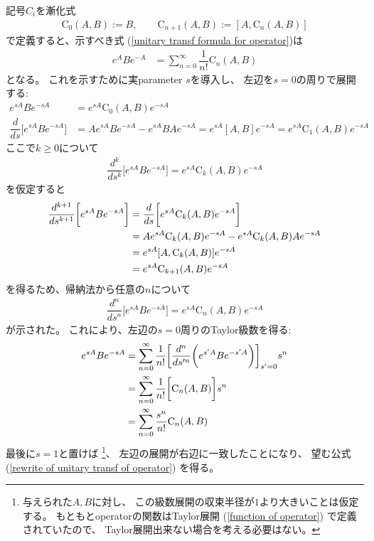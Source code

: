 記号$C_i$を漸化式
\begin{align}
    \mathrm{C}_0(A,B)
    :=
    B
,\qquad
    \mathrm{C}_{n+1}(A,B)
    :=
    [A,\mathrm{C}_{n}(A,B)]
\end{align}
で定義すると、示すべき式
(\ref{unitary transf formula for operator})は
\begin{align}
    e^{A} B e^{-A}
    &=
    \sum_{n=0}^\infty
    \dfrac{1}{n!}
    \mathrm{C}_{n}(A,B)
\label{rewrite of unitary transf of operator}
\end{align}
となる。
これを示すために実parameter $s$を導入し、
左辺を$s=0$の周りで展開する:
\begin{subequations}
\begin{align}
    e^{sA} B e^{-sA}
    &=
    e^{sA} \mathrm{C}_{0}(A,B)e^{-sA}
\\
    \dfrac{d}{ds}\bigg[
        e^{sA} B e^{-sA}
    \bigg]
    &=
    Ae^{sA} B e^{-sA}
    -
    e^{sA} B A e^{-sA}
    =
    e^{sA} [A,B]e^{-sA}
    =
    e^{sA} \mathrm{C}_{1}(A,B) e^{-sA}
\end{align}
\end{subequations}
ここで$k \ge 0$について
\begin{align}
    \dfrac{d^k}{ds^k}\bigg[
        e^{sA} B e^{-sA}
    \bigg]
    =
    e^{sA} \mathrm{C}_{k}(A,B) e^{-sA}
\end{align}
を仮定すると
\begin{align}
    \dfrac{d^{k+1}}{ds^{k+1}}
    \bigg[
        e^{sA} B e^{-sA}
    \bigg]
&=
    \dfrac{d}{ds}\bigg[
        e^{sA} \mathrm{C}_{k}(A,B) e^{-sA}
    \bigg]
\notag\\&=
    A e^{sA} \mathrm{C}_{k}(A,B) e^{-sA}
    -
    e^{sA} \mathrm{C}_{k}(A,B) Ae^{-sA}
\notag\\&=
    e^{sA} [A,\mathrm{C}_{k}(A,B)] e^{-sA}
\notag\\&=
    e^{sA}  \mathrm{C}_{k+1}(A,B) e^{-sA}
\end{align}
を得るため、帰納法から任意の$n$について
\begin{align}
    \dfrac{d^n}{ds^n}\bigg[
        e^{sA} B e^{-sA}
    \bigg]
    =
    e^{sA} \mathrm{C}_{n}(A,B) e^{-sA}
\end{align}
が示された。
これにより、左辺の$s=0$周りのTaylor級数を得る:
\begin{align}
    e^{sA} B e^{-sA}
&=
    \sum_{n=0}^\infty
        \dfrac{1}{n!}
    \bigg[
        \dfrac{d^n}{ds'^n}
        \bigg(
            e^{s'A} B e^{-s'A}
        \bigg)
    \bigg]_{s'=0}
    s^n
\notag\\&=
    \sum_{n=0}^\infty
        \dfrac{1}{n!}
    \bigg[
        \mathrm{C}_{n}(A,B)
    \bigg]
    s^n
\notag\\&=
    \sum_{n=0}^\infty
        \dfrac{s^n}{n!}
    \mathrm{C}_{n}(A,B)
\end{align}
最後に$s=1$と置けば
\footnote{
与えられた$A, B$に対し、
この級数展開の収束半径が$1$より大きいことは仮定する。
もともとoperatorの関数はTaylor展開
(\ref{function of operator})
で定義されていたので、
Taylor展開出来ない場合を考える必要はない。
}、
左辺の展開が右辺に一致したことになり、
望む公式
(\ref{rewrite of unitary transf of operator})
を得る。

